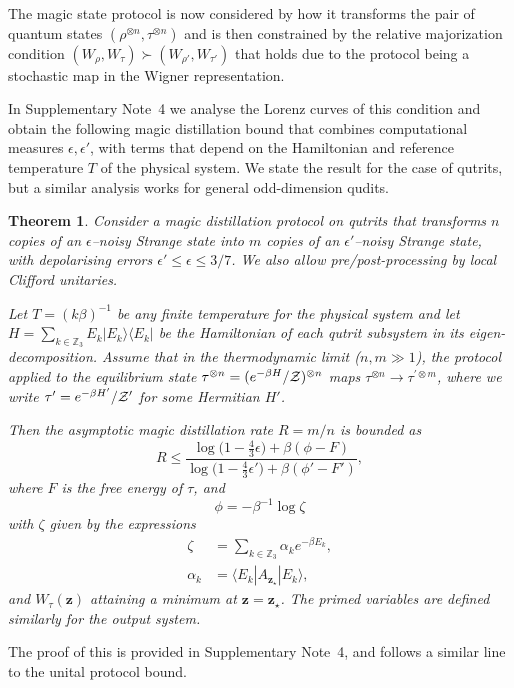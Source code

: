 \documentclass[
onecolumn,
superscriptaddress
]{revtex4-1}
\newtheorem{theorem}{Theorem}
\def\>{\rangle}
\def\<{\langle}
\def\z{\boldsymbol{z}}
\def\Z{{\cal Z}}
\begin{document}
The magic state protocol is now considered by how it transforms the pair of quantum states $(\rho^{\otimes n}, \tau^{\otimes n})$ and is then constrained by the relative majorization condition $(W_{\rho}, W_\tau) \succ (W_{\rho'}, W_{\tau'})$ that holds due to the protocol being a stochastic map in the Wigner representation.

In Supplementary Note~4 we analyse the Lorenz curves of this condition and obtain the following magic distillation bound that combines computational measures $\epsilon,\epsilon'$, with terms that depend on the Hamiltonian and reference temperature $T$ of the physical system. We state the result for the case of qutrits, but a similar analysis works for general odd-dimension qudits.

\begin{theorem}\label{thm:free-energy}
	Consider a magic distillation protocol on qutrits that transforms $n$ copies of an $\epsilon$--noisy Strange state into $m$ copies of an $\epsilon'$--noisy Strange state, with depolarising errors $\epsilon' \leq \epsilon \leq 3/7$. We also allow pre/post-processing by local Clifford unitaries.
	
	Let $T =(k\beta)^{-1}$ be any finite temperature for the physical system and let $H= \sum_{k \in \mathbb{Z}_3} E_k |E_k\>\<E_k|$ be the Hamiltonian of each qutrit subsystem in its eigen-decomposition.
Assume that in the thermodynamic limit ($n,m \gg 1$), the protocol applied to the equilibrium state $\tau^{\otimes n} = (e^{-\beta H}/\Z)^{\otimes n}$ maps $\tau^{\otimes n} \longrightarrow \tau^{\prime \otimes m}$, where we write $\tau' = e^{-\beta H'}/\Z'$ for some Hermitian $H'$.

Then the asymptotic magic distillation rate $R = m/n$ is bounded as
\begin{equation}\label{eq:rate_bounds_proof}
	R \leq \dfrac{\log \big( 1-\frac{4}{3}\epsilon \big) + \beta (\phi - F)}{\log \big( 1-\frac{4}{3}\epsilon' \big) + \beta (\phi' - F')},
\end{equation}
where $F$ is the free energy of $\tau$,  and 
\begin{equation}\label{eq:phi}
	\phi = -\beta^{-1} \log \zeta
\end{equation}
with $\zeta$ given by the expressions
\begin{align}
	\zeta &= \sum_{k\in \mathbb{Z}_3} \alpha_k e^{-\beta E_k}, \\
	\alpha_k &= \<E_k| A_{\z_\star} |E_k\>,
\end{align}
and $W_\tau(\z)$ attaining a minimum at $\z=\z_\star$. The primed variables are defined similarly for the output system.
\end{theorem}
\noindent The proof of this is provided in Supplementary Note~4, and follows a similar line to the unital protocol bound.
\end{document}
